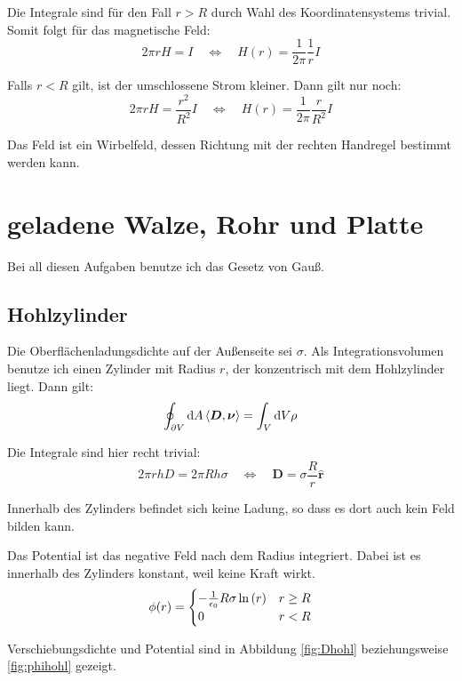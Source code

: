 \documentclass[11pt, ngerman, fleqn]{article}
\newcommand{\inner}[2]{\left\langle #1, #2 \right\rangle}
\renewcommand{\vec}[1]{\boldsymbol{#1}}
\begin{document}
Die Integrale sind für den Fall $r > R$ durch Wahl des Koordinatensystems trivial. Somit folgt für das magnetische Feld:
\[
	2 \pi r H = I
	\quad \Leftrightarrow \quad
	H(r) = \frac{1}{2\pi} \frac{1}r I
\]

Falls $r < R$ gilt, ist der umschlossene Strom kleiner. Dann gilt nur noch:
\[
	2 \pi r H = \frac{r^2}{R^2} I
	\quad \Leftrightarrow \quad
	H(r) = \frac{1}{2\pi} \frac{r}{R^2} I
\]

Das Feld ist ein Wirbelfeld, dessen Richtung mit der rechten Handregel bestimmt
werden kann.


\section{geladene Walze, Rohr und Platte}
\label{5}

Bei all diesen Aufgaben benutze ich das Gesetz von Gauß.

\subsection{Hohlzylinder}

Die Oberflächenladungsdichte auf der Außenseite sei $\sigma$. Als
Integrationsvolumen benutze ich einen Zylinder mit Radius $r$, der konzentrisch mit dem
Hohlzylinder liegt. Dann gilt:
\[
	\oint_{\partial V} \dif A \inner{\vec D}{\vec \nu} = \int_V \dif V \rho
\]

Die Integrale sind hier recht trivial:
\[
	2 \pi r h D = 2 \pi R h \sigma
	\quad \Leftrightarrow \quad
	\vec D = \sigma \frac{R}{r} \hat{\vec r}
\]

Innerhalb des Zylinders befindet sich keine Ladung, so dass es dort auch kein Feld bilden kann.

Das Potential ist das negative Feld nach dem Radius integriert. Dabei ist es innerhalb des Zylinders konstant, weil keine Kraft wirkt.
\[
	\phi(r) = \begin{cases}
	-	\frac{1}{\epsilon_0} R \sigma \ln\del{r} & r \geq R \\
														0 & r < R
	\end{cases}
\]

Verschiebungsdichte und Potential sind in Abbildung \ref{fig:Dhohl} beziehungsweise \ref{fig:phihohl} gezeigt.
\end{document}
